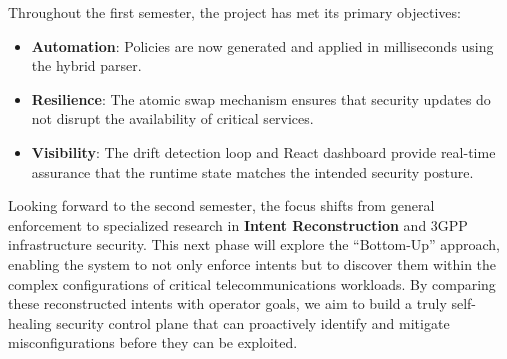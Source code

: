 \documentclass[12pt,a4paper]{article}
\begin{document}
Throughout the first semester, the project has met its primary objectives:
\begin{itemize}
    \item \textbf{Automation}: Policies are now generated and applied in milliseconds using the hybrid parser.
    \item \textbf{Resilience}: The atomic swap mechanism ensures that security updates do not disrupt the availability of critical services.
    \item \textbf{Visibility}: The drift detection loop and React dashboard provide real-time assurance that the runtime state matches the intended security posture.
\end{itemize}

Looking forward to the second semester, the focus shifts from general enforcement to specialized research in \textbf{Intent Reconstruction} and 3GPP infrastructure security. This next phase will explore the ``Bottom-Up'' approach, enabling the system to not only enforce intents but to discover them within the complex configurations of critical telecommunications workloads. By comparing these reconstructed intents with operator goals, we aim to build a truly self-healing security control plane that can proactively identify and mitigate misconfigurations before they can be exploited.

\newpage

\printbibliography
\end{document}
